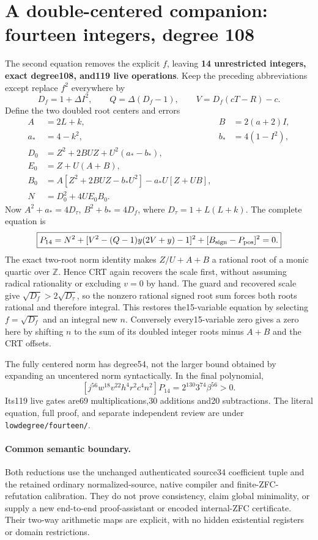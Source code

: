 \section{A double-centered companion: fourteen integers, degree 108}
\label{sec:double-carrier}
The second equation removes the explicit $f$, leaving \textbf{14 unrestricted
integers, exact degree108, and119 live operations}.  Keep the preceding
abbreviations except replace $f^2$ everywhere by
\[
 D_f=1+\Delta I^2,\qquad Q=\Delta(D_f-1),\qquad
 V=D_f(cT-R)-c.
\]
Define the two doubled root centers and errors
\begin{align*}
 A&=2L+k,&B&=2(a+2)I,\\
 a_*&=4-k^2,&b_*&=4(1-I^2),\\
 D_0&=Z^2+2BUZ+U^2(a_*-b_*),\\
 E_0&=Z+U(A+B),\\
 B_0&=A[Z^2+2BUZ-b_*U^2]-a_*U[Z+UB],\\
 N&=D_0^2+4UE_0B_0.
\end{align*}
Now $A^2+a_*=4D_\tau$, $B^2+b_*=4D_f$, where
$D_\tau=1+L(L+k)$.  The complete equation is
\begin{equation}\label{eq:carrier14}
 \boxed{P_{14}=N^2+[V^2-(Q-1)y(2V+y)-1]^2+
 [B_{\rm sign}-P_{\rm pos}]^2=0.}
\end{equation}
The exact two-root norm identity makes $Z/U+A+B$ a rational root of a monic
quartic over $\mathbb Z$.  Hence CRT again recovers the scale first, without
assuming radical rationality or excluding $v=0$ by hand.  The guard and
recovered scale give $\sqrt{D_f}>2\sqrt{D_\tau}$, so the nonzero rational
signed root sum forces both roots rational and therefore integral.  This
restores the15-variable equation by selecting $f=\sqrt{D_f}$ and an integral
new $n$.  Conversely every15-variable zero gives a zero here by shifting
$n$ to the sum of its doubled integer roots minus $A+B$ and the CRT offsets.

The fully centered norm has degree54, not the larger bound obtained by
expanding an uncentered norm syntactically.  In the final polynomial,
\[
 [j^{56}w^{18}v^{22}h^4r^2c^4n^2]P_{14}
   =2^{130}3^{74}\beta^{56}>0.
\]
Its119 live gates are69 multiplications,30 additions and20 subtractions.
The literal equation, full proof, and separate independent review are under
\texttt{lowdegree/fourteen/}.

\paragraph{Common semantic boundary.}
Both reductions use the unchanged authenticated source34 coefficient tuple
and the retained ordinary normalized-source, native compiler and finite-ZFC-
refutation calibration.  They do not prove consistency, claim global
minimality, or supply a new end-to-end proof-assistant or encoded internal-ZFC
certificate.  Their two-way arithmetic maps are explicit, with no hidden
existential registers or domain restrictions.
